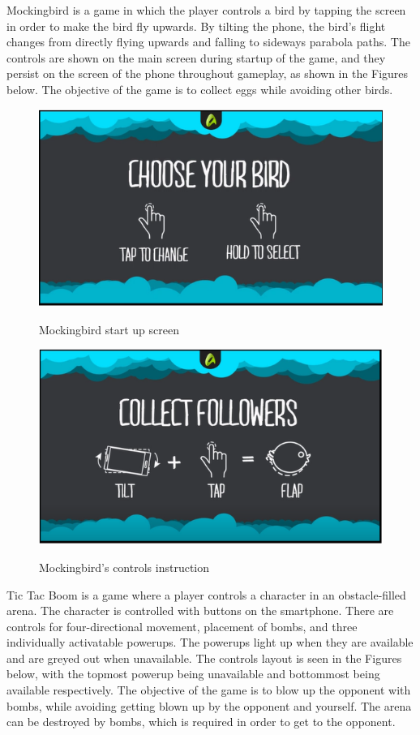 Mockingbird is a game in which the player controls a bird by tapping the screen in order to make the bird fly upwards. By tilting the phone, the bird’s flight changes from directly flying upwards and falling to sideways parabola paths. The controls are shown on the main screen during startup of the game, and they persist on the screen of the phone throughout gameplay, as shown in the Figures below. The objective of the game is to collect eggs while avoiding other birds.
\begin{figure}
\centering
\includegraphics[width=\textwidth]{figures/birdSelect} \label{fig:MBird1}
\caption{Mockingbird start up screen}
\end{figure}
\begin{figure}
\centering
\includegraphics[width=\textwidth]{figures/birdPlay} \label{fig:MBird2}
\caption{Mockingbird's controls instruction}
\end{figure}

Tic Tac Boom is a game where a player controls a character in an obstacle-filled arena. The character is controlled with buttons on the smartphone. There are controls for four-directional movement, placement of bombs, and three individually activatable powerups. The powerups light up when they are available and are greyed out when unavailable. The controls layout is seen in the Figures below, with the topmost powerup being unavailable and bottommost being available respectively. The objective of the game is to blow up the opponent with bombs, while avoiding getting blown up by the opponent and yourself. The arena can be destroyed by bombs, which is required in order to get to the opponent.

